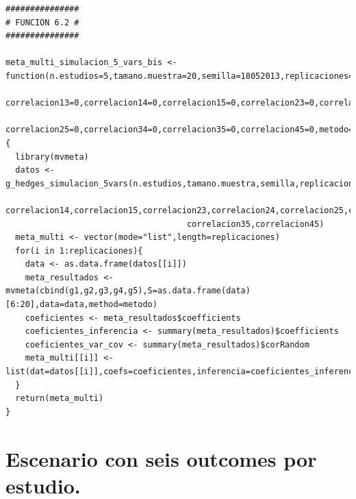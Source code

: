 \documentclass[a4paper,openright,12pt]{report}
\begin{document}
{\begin{verbatim}
###############
# FUNCION 6.2 #
###############

meta_multi_simulacion_5_vars_bis <- function(n.estudios=5,tamano.muestra=20,semilla=18052013,replicaciones=5,correlacion12=0,
                                             correlacion13=0,correlacion14=0,correlacion15=0,correlacion23=0,correlacion24=0,
                                             correlacion25=0,correlacion34=0,correlacion35=0,correlacion45=0,metodo="reml"){
  library(mvmeta)
  datos <- g_hedges_simulacion_5vars(n.estudios,tamano.muestra,semilla,replicaciones,correlacion12,correlacion13,
                                     correlacion14,correlacion15,correlacion23,correlacion24,correlacion25,correlacion34,
                                     correlacion35,correlacion45)
  meta_multi <- vector(mode="list",length=replicaciones)
  for(i in 1:replicaciones){
    data <- as.data.frame(datos[[i]])
    meta_resultados <- mvmeta(cbind(g1,g2,g3,g4,g5),S=as.data.frame(data)[6:20],data=data,method=metodo)
    coeficientes <- meta_resultados$coefficients
    coeficientes_inferencia <- summary(meta_resultados)$coefficients
    coeficientes_var_cov <- summary(meta_resultados)$corRandom
    meta_multi[[i]] <- list(dat=datos[[i]],coefs=coeficientes,inferencia=coeficientes_inferencia,var_cov=coeficientes_var_cov)
  }
  return(meta_multi)  
}
\end{verbatim}}

\section{Escenario con seis outcomes por estudio.}
\end{document}
